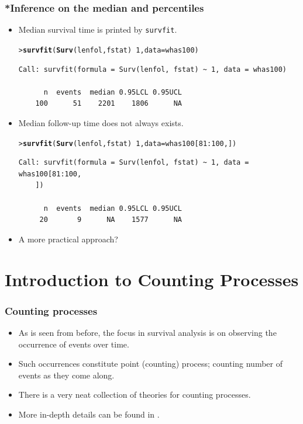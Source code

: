 \documentclass[10pt]{beamer}\usepackage[]{graphicx}\usepackage[]{color}
\makeatletter
\newcommand{\hlnum}[1]{\textcolor[rgb]{0.686,0.059,0.569}{#1}}%
\newcommand{\hlopt}[1]{\textcolor[rgb]{0,0,0}{#1}}%
\newcommand{\hlstd}[1]{\textcolor[rgb]{0.345,0.345,0.345}{#1}}%
\newcommand{\hlkwc}[1]{\textcolor[rgb]{0.333,0.667,0.333}{#1}}%
\newcommand{\hlkwd}[1]{\textcolor[rgb]{0.737,0.353,0.396}{\textbf{#1}}}%
\newenvironment{kframe}{%
 \def\at@end@of@kframe{}%
 \ifinner\ifhmode%
  \def\at@end@of@kframe{\end{minipage}}%
  \begin{minipage}{\columnwidth}%
 \fi\fi%
 \def\FrameCommand##1{\hskip\@totalleftmargin \hskip-\fboxsep
 \colorbox{shadecolor}{##1}\hskip-\fboxsep
     \hskip-\linewidth \hskip-\@totalleftmargin \hskip\columnwidth}%
 \MakeFramed {\advance\hsize-\width
   \@totalleftmargin\z@ \linewidth\hsize
   \@setminipage}}%
 {\par\unskip\endMakeFramed%
 \at@end@of@kframe}
\newenvironment{knitrout}{}{} %
\renewenvironment{knitrout}{\setlength{\topsep}{-.2mm}}{}
\newcommand{\code}[1]{{\texttt{#1}}}
\makeatother
\begin{document}
\begin{frame}[fragile]
  \frametitle{*Inference on the median and percentiles}
  \begin{itemize}  
  \item Median survival time is printed by \code{survfit}.
\begin{knitrout}\scriptsize
{}\color{fgcolor}\begin{kframe}
\begin{alltt}
\hlstd{> }\hlkwd{survfit}\hlstd{(}\hlkwd{Surv}\hlstd{(lenfol, fstat)} \hlopt{~} \hlnum{1}\hlstd{,} \hlkwc{data} \hlstd{= whas100)}
\end{alltt}
\begin{verbatim}
Call: survfit(formula = Surv(lenfol, fstat) ~ 1, data = whas100)

      n  events  median 0.95LCL 0.95UCL 
    100      51    2201    1806      NA 
\end{verbatim}
\end{kframe}
\end{knitrout}
  \item Median follow-up time does not always exists.
\begin{knitrout}\scriptsize
{}\color{fgcolor}\begin{kframe}
\begin{alltt}
\hlstd{> }\hlkwd{survfit}\hlstd{(}\hlkwd{Surv}\hlstd{(lenfol, fstat)} \hlopt{~} \hlnum{1}\hlstd{,} \hlkwc{data} \hlstd{= whas100[}\hlnum{81}\hlopt{:}\hlnum{100}\hlstd{,])}
\end{alltt}
\begin{verbatim}
Call: survfit(formula = Surv(lenfol, fstat) ~ 1, data = whas100[81:100, 
    ])

      n  events  median 0.95LCL 0.95UCL 
     20       9      NA    1577      NA 
\end{verbatim}
\end{kframe}
\end{knitrout}
  \item A more practical approach?
  \end{itemize}
\end{frame}

\section{Introduction to Counting Processes}
\begin{frame}
  \frametitle{Counting processes}
  \begin{itemize}  
  \item As is seen from before, the focus in survival analysis is on observing the occurrence of events over time. 
  \item Such occurrences constitute point (counting) process; counting number of events as they come along. 
  \item There is a very neat collection of theories for counting processes.
  \item More in-depth details can be found in \citet{fleming2011counting,kalbfleisch2011statistical}.
  \end{itemize}    
\end{frame}
\end{document}
